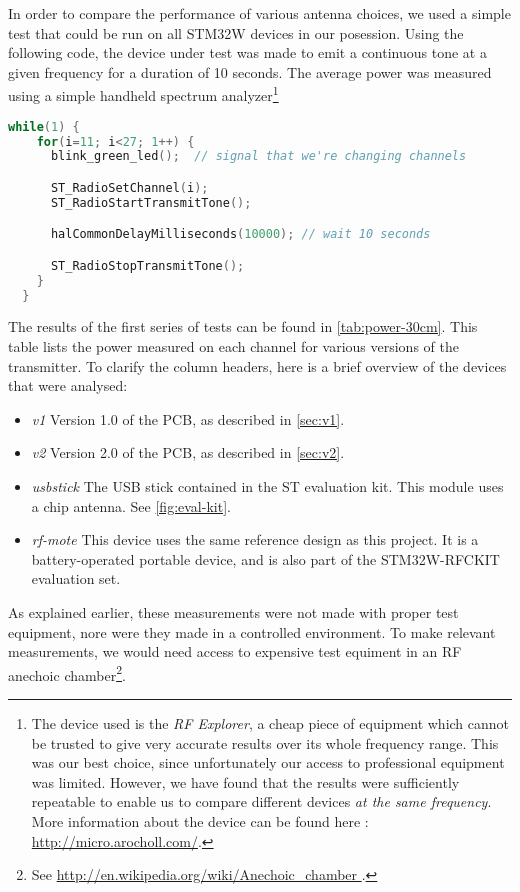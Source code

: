 In order to compare the performance of various antenna choices, we used a simple
test that could be run on all STM32W devices in our posession. Using the
following code, the device under test was made to emit a continuous tone at
a given frequency for a duration of 10 seconds. The average power was measured
using a simple handheld spectrum analyzer\footnote{The device used is the
\emph{RF Explorer}, a cheap piece of equipment which cannot be trusted to give
very accurate results over its whole frequency range. This was our best choice,
since unfortunately our access to professional equipment was limited. However,
we have found that the results were sufficiently repeatable to enable us to
compare different devices \emph{at the same frequency}. More information about
the device can be found here : \url{http://micro.arocholl.com/}.}

\begin{lstlisting}[language=C,caption=Tone generation code]
  while(1) {
    for(i=11; i<27; 1++) {
      blink_green_led();  // signal that we're changing channels

      ST_RadioSetChannel(i);
      ST_RadioStartTransmitTone();

      halCommonDelayMilliseconds(10000); // wait 10 seconds

      ST_RadioStopTransmitTone();
    }
  }
\end{lstlisting}

The results of the first series of tests can be found in
\autoref{tab:power-30cm}. This table lists the power measured on each channel
for various versions of the transmitter. To clarify the column headers, here is
a brief overview of the devices that were analysed:

\begin{itemize}
  \item \emph{v1} Version 1.0 of the PCB, as described in \autoref{sec:v1}.
  \item \emph{v2} Version 2.0 of the PCB, as described in \autoref{sec:v2}.
  \item \emph{usbstick} The USB stick contained in the ST evaluation kit. This
    module uses a chip antenna. See \autoref{fig:eval-kit}.
  \item \emph{rf-mote} This device uses the same reference design as this
    project. It is a battery-operated portable device, and is also part of the
    STM32W-RFCKIT evaluation set.
\end{itemize}

As explained earlier, these measurements were not made with proper test
equipment, nore were they made in a controlled environment. To make relevant
measurements, we would need access to expensive test equiment in an RF anechoic
chamber\footnote{ See \url{ http://en.wikipedia.org/wiki/Anechoic_chamber }.}.

